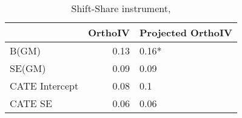 \begin{table}\centering\caption{Shift-Share instrument, }\begin{tabular}{lrl}
\toprule
                &   OrthoIV & Projected OrthoIV   \\
\midrule
 B(GM)          &      0.13 & 0.16*               \\
 SE(GM)         &      0.09 & 0.09                \\
 CATE Intercept &      0.08 & 0.1                 \\
 CATE SE        &      0.06 & 0.06                \\
\bottomrule
\end{tabular}\end{table}